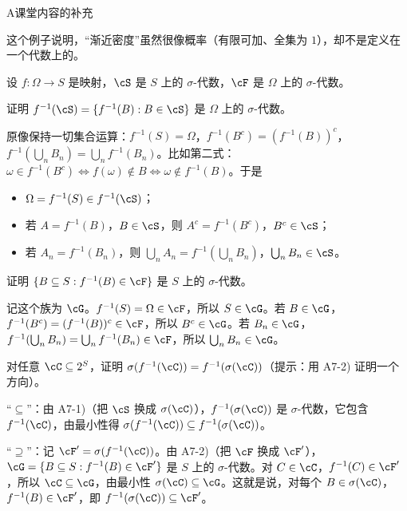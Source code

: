 \begin{exercises}{A}{课堂内容的补充}
\begin{questions}
\begin{solution}
这个例子说明，“渐近密度”虽然很像概率（有限可加、全集为 $1$），却不是定义在一个代数上的。
\end{solution}
\end{questions}

\item\label{ex:set-systems:A7} 设 $f:\Omega\to S$ 是映射，$\cS$ 是 $S$ 上的 $\sigma$-代数，$\cF$ 是 $\Omega$ 上的 $\sigma$-代数。
\begin{questions}
\item 证明 $f^{-1}(\cS)=\{f^{-1}(B): B\in\cS\}$ 是 $\Omega$ 上的 $\sigma$-代数。
\begin{solution}
原像保持一切集合运算：$f^{-1}(S)=\Omega$，$f^{-1}(B^c)=(f^{-1}(B))^c$，$f^{-1}(\bigcup_nB_n)=\bigcup_nf^{-1}(B_n)$。比如第二式：$\omega\in f^{-1}(B^c)\iff f(\omega)\notin B\iff\omega\notin f^{-1}(B)$。于是
\begin{itemize}
\item $\Omega=f^{-1}(S)\in f^{-1}(\cS)$；
\item 若 $A=f^{-1}(B)$，$B\in\cS$，则 $A^c=f^{-1}(B^c)$，$B^c\in\cS$；
\item 若 $A_n=f^{-1}(B_n)$，则 $\bigcup_nA_n=f^{-1}(\bigcup_nB_n)$，$\bigcup_nB_n\in\cS$。
\end{itemize}
\end{solution}
\item 证明 $\{B\subseteq S: f^{-1}(B)\in\cF\}$ 是 $S$ 上的 $\sigma$-代数。
\begin{solution}
记这个族为 $\cG$。$f^{-1}(S)=\Omega\in\cF$，所以 $S\in\cG$。若 $B\in\cG$，$f^{-1}(B^c)=(f^{-1}(B))^c\in\cF$，所以 $B^c\in\cG$。若 $B_n\in\cG$，$f^{-1}(\bigcup_nB_n)=\bigcup_nf^{-1}(B_n)\in\cF$，所以 $\bigcup_nB_n\in\cG$。
\end{solution}
\item 对任意 $\cC\subseteq2^S$，证明 $\sigma(f^{-1}(\cC))=f^{-1}(\sigma(\cC))$（提示：用 A7-2) 证明一个方向）。
\begin{solution}
“$\subseteq$”：由 A7-1)（把 $\cS$ 换成 $\sigma(\cC)$），$f^{-1}(\sigma(\cC))$ 是 $\sigma$-代数，它包含 $f^{-1}(\cC)$，由最小性得 $\sigma(f^{-1}(\cC))\subseteq f^{-1}(\sigma(\cC))$。

“$\supseteq$”：记 $\cF'=\sigma(f^{-1}(\cC))$。由 A7-2)（把 $\cF$ 换成 $\cF'$），$\cG=\{B\subseteq S: f^{-1}(B)\in\cF'\}$ 是 $S$ 上的 $\sigma$-代数。对 $C\in\cC$，$f^{-1}(C)\in\cF'$，所以 $\cC\subseteq\cG$，由最小性 $\sigma(\cC)\subseteq\cG$。这就是说，对每个 $B\in\sigma(\cC)$，$f^{-1}(B)\in\cF'$，即 $f^{-1}(\sigma(\cC))\subseteq\cF'$。


\end{solution}
\end{questions}
\end{exercises}
